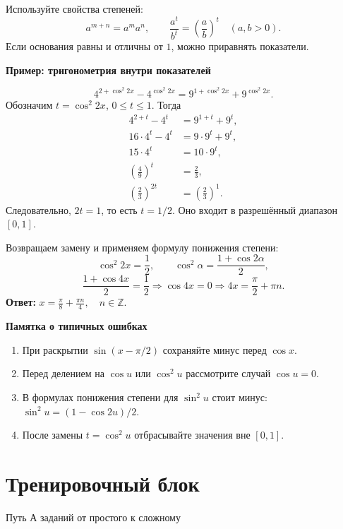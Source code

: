 \documentclass[a4paper,12pt]{article}
\newcommand{\key}[1]{\textcolor{darkaccent}{\textbf{#1}}}
\newcommand{\sub}[1]{\vspace{.45em}\noindent\textcolor{darkaccent}{\bfseries #1}\par\smallskip}
\newcommand{\sect}[1]{\section*{\color{darkaccent}#1}}
\begin{document}
Используйте свойства степеней:
\[
a^{m+n}=a^m a^n,
\qquad \frac{a^t}{b^t}=\left(\frac ab\right)^t
\quad (a,b>0).
\]
Если основания равны и отличны от $1$, можно приравнять показатели.

\sub{Пример: тригонометрия внутри показателей}
\[
4^{2+\cos^2 2x}-4^{\cos^2 2x}
=9^{1+\cos^2 2x}+9^{\cos^2 2x}.
\]
Обозначим $t=\cos^2 2x$, $0\le t\le1$. Тогда
\[
\begin{aligned}
4^{2+t}-4^t&=9^{1+t}+9^t,\\
16\cdot4^t-4^t&=9\cdot9^t+9^t,\\
15\cdot4^t&=10\cdot9^t,\\
\left(\frac49\right)^t&=\frac23,\\
\left(\frac23\right)^{2t}&=\left(\frac23\right)^1.
\end{aligned}
\]
Следовательно, $2t=1$, то есть $t=1/2$. Оно входит в разрешённый диапазон $[0,1]$.

Возвращаем замену и применяем формулу понижения степени:
\[
\cos^2 2x=\frac12,
\qquad \cos^2\alpha=\frac{1+\cos2\alpha}{2},
\]
\[
\frac{1+\cos4x}{2}=\frac12
\Longrightarrow \cos4x=0
\Longrightarrow 4x=\frac\pi2+\pi n.
\]
\key{Ответ:}
$\displaystyle \boxed{x=\frac\pi8+\frac{\pi n}{4},\quad n\in\mathbb Z.}$

\sub{Памятка о типичных ошибках}
\begin{enumerate}[label=\textcolor{accent}{\arabic*.},leftmargin=8mm,itemsep=3pt]
\item При раскрытии $\sin(x-\pi/2)$ сохраняйте минус перед $\cos x$.
\item Перед делением на $\cos u$ или $\cos^2u$ рассмотрите случай $\cos u=0$.
\item В формулах понижения степени для $\sin^2u$ стоит минус: $\sin^2u=(1-\cos2u)/2$.
\item После замены $t=\cos^2u$ отбрасывайте значения вне $[0,1]$.
\end{enumerate}
\clearpage

\sect{Тренировочный блок}
\textcolor{muted}{Путь А \quad\textbullet{} заданий \quad\textbullet\quad от простого к сложному}
\end{document}

